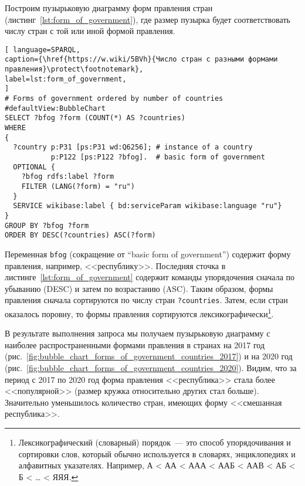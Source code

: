 Построим пузырьковую диаграмму форм правления стран (листинг~\ref{lst:form_of_government}), где размер пузырка будет соответствовать числу стран с той или иной формой правления.


\begin{lstlisting}[ language=SPARQL, 
caption={\href{https://w.wiki/5BVh}{Число стран с разными формами правления}\protect\footnotemark},
label=lst:form_of_government, 
]
# Forms of government ordered by number of countries
#defaultView:BubbleChart
SELECT ?bfog ?form (COUNT(*) AS ?countries)
WHERE 
{
  ?country p:P31 [ps:P31 wd:Q6256]; # instance of a country
           p:P122 [ps:P122 ?bfog].  # basic form of government
  OPTIONAL {
    ?bfog rdfs:label ?form
	FILTER (LANG(?form) = "ru")
  }
  SERVICE wikibase:label { bd:serviceParam wikibase:language "ru"}
}
GROUP BY ?bfog ?form
ORDER BY DESC(?countries) ASC(?form)
\end{lstlisting}



Переменная \lstinline|bfog| (сокращение от ``basic form of government'') содержит форму правления, например, <<республику>>. 
Последняя сточка в листинге~\ref{lst:form_of_government} содержит команды упорядочения 
сначала по убыванию (DESC) и затем по возрастанию (ASC). 
Таким образом, формы правления сначала сортируются по числу стран \lstinline|?countries|. 
Затем, если стран оказалось поровну, то формы правления сортируются лексикографически\footnote{%
%
Лексикографический (словарный) порядок~--- это способ упорядочивания и сортировки слов, 
который обычно используется в словарях, энциклопедиях и алфавитных указателях. 
Например, А < АА < ААА < ААБ < ААВ < АБ < Б < … < ЯЯЯ.%
}.

В результате выполнения запроса мы получаем пузырьковую диаграмму с наиболее распространенными формами правления в странах на 2017 год (рис.~\ref{fig:bubble_chart_forms_of_government_countries_2017}) и на 2020 год (рис.~\ref{fig:bubble_chart_forms_of_government_countries_2020}).
Видим, что за период с 2017 по 2020 год 
форма правления <<республика>> стала более <<популярной>> 
(размер кружка относительно других стал больше). 
Значительно уменьшилось количество стран, имеющих форму  <<смешанная республика>>.


